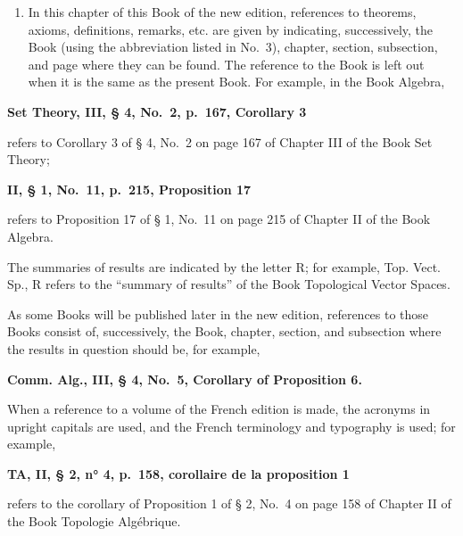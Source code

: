\begin{enumerate}
\def\labelenumi{\arabic{enumi}.}
\setcounter{enumi}{11}
\tightlist
\item
  In this chapter of this Book of the new edition, references to theorems, axioms, definitions, remarks, etc. are given by indicating, successively, the Book (using the abbreviation listed in No.~3), chapter, section, subsection, and page where they can be found. The reference to the Book is left out when it is the same as the present Book. For example, in the Book Algebra,
\end{enumerate}

\textbf{Set Theory, III, § 4, No.~2, p.~167, Corollary 3}

refers to Corollary 3 of § 4, No.~2 on page 167 of Chapter III of the Book Set Theory;

\textbf{II, § 1, No.~11, p.~215, Proposition 17}

refers to Proposition 17 of § 1, No.~11 on page 215 of Chapter II of the Book Algebra.

The summaries of results are indicated by the letter R; for example, Top. Vect. Sp., R refers to the ``summary of results'' of the Book Topological Vector Spaces.

As some Books will be published later in the new edition, references to those Books consist of, successively, the Book, chapter, section, and subsection where the results in question should be, for example,

\textbf{Comm. Alg., III, § 4, No.~5, Corollary of Proposition 6.}

When a reference to a volume of the French edition is made, the acronyms in upright capitals are used, and the French terminology and typography is used; for example,

\textbf{TA, II, § 2, n° 4, p.~158, corollaire de la proposition 1}

refers to the corollary of Proposition 1 of § 2, No.~4 on page 158 of Chapter II of the Book Topologie Algébrique.

